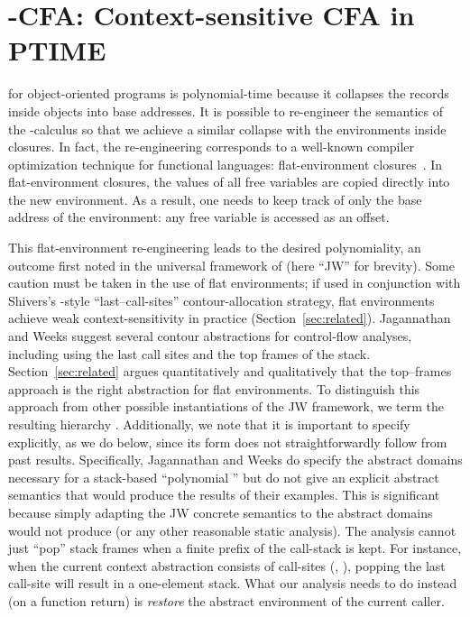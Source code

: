 \section{-CFA: Context-sensitive CFA in PTIME}
\label{sec:mcfa}

\kCFA{} for object-oriented programs is polynomial-time because it
collapses the records inside objects into base addresses.
It is possible to re-engineer the semantics of the -calculus
so that we achieve a similar collapse with the environments inside
closures.
In fact, the re-engineering corresponds to a well-known compiler
optimization technique for functional languages: flat-environment
closures~\cite{dvanhorn:Cardelli1984Compiling,dvanhorn:Appel1991Compiling}.
In flat-environment closures, the values of all free variables are
copied directly into the new environment.
As a result, one needs to keep track of only the base address of the
environment: any free variable is accessed as an offset.


This flat-environment re-engineering leads to the desired
polynomiality, an outcome first noted in the universal framework of
\citet{mattmight:Jagannathan:1995:Unified} (here ``JW'' for brevity).
Some caution must be taken in the use of flat environments; 
if used in conjunction with Shivers's \kCFA{}-style
``last--call-sites'' contour-allocation strategy, flat environments
achieve weak context-sensitivity in practice
(Section~\ref{sec:related}).
Jagannathan and Weeks
suggest several contour abstractions for control-flow analyses,
including using the last  call sites and the top  frames of the
stack.
Section~\ref{sec:related} argues quantitatively and qualitatively that
the top--frames approach is the right abstraction for flat environments.
To distinguish this approach from other possible instantiations of the
JW framework, we term the
resulting hierarchy \nCFA{}.
Additionally, we note that it is important to specify \nCFA{}
explicitly, as we do below, since its form does not straightforwardly
follow from past results. Specifically,
Jagannathan and Weeks
do specify the abstract
domains necessary for a stack-based ``polynomial \kCFA'' but do not give an
explicit abstract semantics that would produce the results of their
examples. This is significant because simply adapting the
JW concrete semantics to the abstract domains would not produce
\nCFA{} (or any other reasonable static analysis). The analysis cannot
just ``pop'' stack frames when a finite prefix of the call-stack is
kept. For instance, when the current context abstraction consists of
call-sites (, ), popping the last call-site will result in a
one-element stack. What our analysis needs to do instead (on a
function return) is \emph{restore} the abstract environment of the
current caller.


